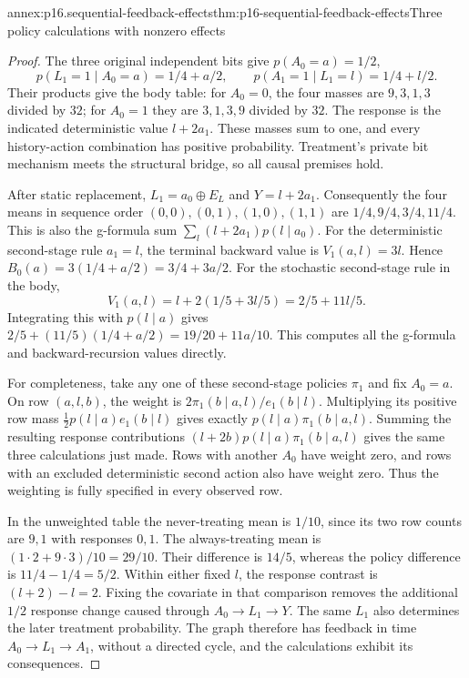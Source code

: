 \begin{annexitem}{annex:p16.sequential-feedback-effects}{thm:p16-sequential-feedback-effects}{Three policy calculations with nonzero effects}
\begin{proof}
The three original independent bits give \(p(A_0=a)=1/2\),
\[
 p(L_1=1\mid A_0=a)=1/4+a/2,
 \qquad p(A_1=1\mid L_1=l)=1/4+l/2.
\]
Their products give the body table: for \(A_0=0\), the four masses
are \(9,3,1,3\) divided by \(32\); for \(A_0=1\) they are
\(3,1,3,9\) divided by \(32\). The response is the indicated
deterministic value \(l+2a_1\). These masses sum to one, and every
history-action combination has positive probability. Treatment's private
bit mechanism meets the structural bridge, so all causal premises hold.

After static replacement, \(L_1=a_0\oplus E_L\) and
\(Y=l+2a_1\). Consequently the four means in sequence order
\((0,0),(0,1),(1,0),(1,1)\) are
\(1/4,9/4,3/4,11/4\). This is also the g-formula sum
\(\sum_l(l+2a_1)p(l\mid a_0)\).
For the deterministic second-stage rule \(a_1=l\), the terminal
backward value is \(V_1(a,l)=3l\). Hence
\(B_0(a)=3(1/4+a/2)=3/4+3a/2\).
For the stochastic second-stage rule in the body,
\[
 V_1(a,l)=l+2(1/5+3l/5)=2/5+11l/5.
\]
Integrating this with \(p(l\mid a)\) gives
\(2/5+(11/5)(1/4+a/2)=19/20+11a/10\).
This computes all the g-formula and backward-recursion values directly.

For completeness, take any one of these second-stage policies \(\pi_1\)
and fix \(A_0=a\). On row \((a,l,b)\), the weight is
\(2\pi_1(b\mid a,l)/e_1(b\mid l)\). Multiplying its positive
row mass \(\frac12p(l\mid a)e_1(b\mid l)\) gives exactly
\(p(l\mid a)\pi_1(b\mid a,l)\). Summing the resulting response
contributions \((l+2b)p(l\mid a)\pi_1(b\mid a,l)\) gives the same
three calculations just made. Rows with another \(A_0\) have weight
zero, and rows with an excluded deterministic second action also have
weight zero. Thus the weighting is fully specified in every observed row.

In the unweighted table the never-treating mean is \(1/10\), since its
two row counts are \(9,1\) with responses \(0,1\). The always-treating
mean is \((1\cdot2+9\cdot3)/10=29/10\). Their difference is
\(14/5\), whereas the policy difference is \(11/4-1/4=5/2\).
Within either fixed \(l\), the response contrast is
\((l+2)-l=2\). Fixing the covariate in that comparison removes the
additional \(1/2\) response change caused through \(A_0\to L_1\to Y\).
The same \(L_1\) also determines the later treatment probability.
The graph therefore has feedback in time \(A_0\to L_1\to A_1\),
without a directed cycle, and the calculations exhibit its consequences.
\end{proof}
\end{annexitem}


